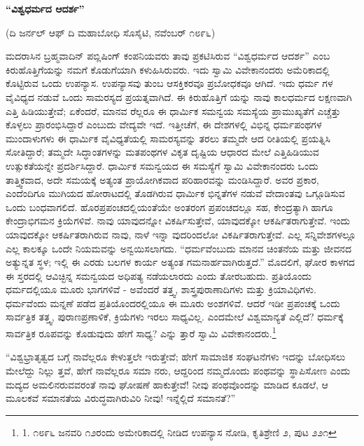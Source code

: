 \begin{center}
\textbf{“ವಿಶ್ವಧರ್ಮದ ಆದರ್ಶ”}
\end{center}

\begin{center}
(ದಿ ಜರ್ನಲ್ ಆಫ್ ದಿ ಮಹಾಬೋಧಿ ಸೊಸೈಟಿ, ನವೆಂಬರ್ ೧೮೯೬)
\end{center}

ಮದರಾಸಿನ ಬ್ರಹ್ಮವಾದಿನ್ ಪಬ್ಲಿಷಿಂಗ್ ಕಂಪನಿಯವರು ತಾವು ಪ್ರಕಟಿಸಿರುವ “ವಿಶ್ವಧರ್ಮದ ಆದರ್ಶ” ಎಂಬ ಕಿರುಹೊತ್ತಿಗೆಯನ್ನು ನಮಗೆ ಕೊಡುಗೆಯಾಗಿ ಕಳುಹಿಸಿರುವರು. ಇದು ಸ್ವಾಮಿ ವಿವೇಕಾನಂದರು ಅಮೆರಿಕಾದಲ್ಲಿ ಕೊಟ್ಟಿರುವ ಒಂದು ಉಪನ್ಯಾಸ. ಉಪನ್ಯಾಸವು ತುಂಬ ಆಸಕ್ತಿಕರವೂ ಪ್ರಬೋಧಕವೂ ಆಗಿದೆ. ಇದು ಧರ್ಮ ಗಳ ವೈವಿಧ್ಯದ ನಡುವೆ ಒಂದು ಸಾಮರಸ್ಯದ ಪ್ರಯತ್ನವಾಗಿದೆ. ಈ ಕಿರುಹೊತ್ತಿಗೆ ಯನ್ನು ನಾವು ಕಾಲಧರ್ಮದ ಲಕ್ಷಣವಾಗಿ ಎತ್ತಿ ಹಿಡಿಯುತ್ತೇವೆ; ಏಕೆಂದರೆ, ಮಾನವ ರೆಲ್ಲರೂ ಈ ಧಾರ್ಮಿಕ ಸಮನ್ವಯ ಸಮಸ್ಯೆಯ ಪ್ರಾಮುಖ್ಯತೆಗೆ ಎಚ್ಚೆತ್ತು ಕೊಳ್ಳಲು ಪ್ರಾರಂಭಿಸಿದ್ದಾರೆ ಎಂಬುದು ವೇದ್ಯವೇ ಇದೆ. ಇತ್ತೀಚೆಗೆ, ಈ ದೇಶಗಳಲ್ಲಿ ವಿಭಿನ್ನ ಧರ್ಮಪಂಥಗಳ ಮುಂದಾಳುಗಳು ಈ ಧಾರ್ಮಿಕ ವೈವಿಧ್ಯತೆಯಲ್ಲಿ ಸಾಮರಸ್ಯವನ್ನು ತರಲು ತಮ್ಮದೇ ಆದ ರೀತಿಯಲ್ಲಿ ಪ್ರಯತ್ನಿಸಿ ಸೋತಿದ್ದಾರೆ; ತಮ್ಮದೇ ಸಿದ್ಧಾಂತಗಳನ್ನು ಮತಪಂಥಗಳ ವಿಕೃತ ದೃಷ್ಟಿಯ ಆಧಾರದ ಮೇಲೆ ಎತ್ತಿಹಿಡಿಯುವ ಉತ್ಸುಕತೆಯನ್ನೇ ಪ್ರದರ್ಶಿಸಿದ್ದಾರೆ. ಧಾರ್ಮಿಕ ಸಮನ್ವಯದ ಈ ಸಮಸ್ಯೆಗೆ ಸ್ವಾಮಿ ವಿವೇಕಾನಂದರು ಒಂದು ತಾತ್ತ್ವಿಕವಾದ, ಅದೇ ಸಮಯಕ್ಕೆ ಅತ್ಯಂತ ಪ್ರಾಯೋಗಿಕವಾದ ಪರಿಹಾರವನ್ನು ಮಂಡಿಸಿದ್ದಾರೆ. ಅವರ ಪ್ರಕಾರ, ಎಂದೆಂದಿಗೂ ಮುಗಿಯದ ಹೋರಾಟದಲ್ಲಿ ತೊಡಗಿರುವ ಧಾರ್ಮಿಕ ಭಿನ್ನತೆಗಳ ನಡುವೆ ವೇದಾಂತವು ಒಗ್ಗೂಡಿಸುವ ಒಂದು ಬಂಧವಾಗಲಿದೆ. ಹೊರಪ್ರಪಂಚದಲ್ಲಿಯಂತೆಯೇ ಅಂತರಂಗ ಪ್ರಪಂಚದಲ್ಲೂ ಸಹ, ಕೇಂದ್ರತ್ಯಾಗಿ ಹಾಗೂ ಕೇಂದ್ರಾಭಿಗಮನ ಕ್ರಿಯೆಗಳಿವೆ. ನಾವು ಯಾವುದನ್ನೋ ವಿಕರ್ಷಿಸುತ್ತೇವೆ, ಯಾವುದಕ್ಕೋ ಆಕರ್ಷಿತರಾಗುತ್ತೇವೆ. ಇಂದು ಯಾವುದಕ್ಕೋ ಆಕರ್ಷಿತರಾಗಿರುವ ನಾವು, ನಾಳೆ ಇನ್ನಾ ವುದರಿಂದಲೋ ವಿಕರ್ಷಿತರಾಗುತ್ತೇವೆ. ಎಲ್ಲ ಸನ್ನಿವೇಶಗಳಲ್ಲೂ ಎಲ್ಲ ಕಾಲಕ್ಕೂ ಒಂದೇ ನಿಯಮವನ್ನು ಅನ್ವಯಿಸಲಾಗದು. “ಧರ್ಮವೆಂಬುದು ಮಾನವ ಚಿಂತನೆಯ ಮತ್ತು ಜೀವನದ ಅತ್ಯುನ್ನತ ಸ್ಥಳ; ಇಲ್ಲಿ ಈ ಎರಡು ಬಲಗಳ ಕಾರ್ಯ ಅತ್ಯಂತ ಗಮನಾರ್ಹವಾಗಿರುತ್ತದೆ.” ಮೊದಲಿಗೆ, ಘೋರ ಕಾಳಗದ ಈ ಸ್ತರದಲ್ಲಿ ಆವಿಚ್ಛಿನ್ನ ಸಮನ್ವಯದ ಅಧಿಪತ್ಯ ನಡೆಯಲಾರದು ಎಂದು ತೋರಬಹುದು. ಪ್ರತಿಯೊಂದು ಧರ್ಮದಲ್ಲಿಯೂ ಮೂರು ಭಾಗಗಳಿವೆ - ಅವೆಂದರೆ ತತ್ತ್ವ, ಶಾಸ್ತ್ರಪುರಾಣಾದಿಗಳು ಮತ್ತು ಕ್ರಿಯಾವಿಧಿಗಳು. ಧರ್ಮವೆಂದು ಮನ್ನಣೆ ಪಡೆದ ಪ್ರತಿಯೊಂದರಲ್ಲಿಯೂ ಈ ಮೂರು ಅಂಶಗಳಿವೆ. ಆದರೆ ಇಡೀ ಪ್ರಪಂಚಕ್ಕೆ ಒಂದು ಸಾರ್ವತ್ರಿಕ ತತ್ತ್ವ, ಪುರಾಣಪ್ರಣಾಳಿಕೆ, ಕ್ರಿಯೆಗಳು ಇರಲು ಸಾಧ್ಯವಿಲ್ಲ. ಎಂದಮೇಲೆ ವಿಶ್ವಮಾನ್ಯತೆ ಎಲ್ಲಿದೆ? ಧರ್ಮಕ್ಕೆ ಸಾರ್ವತ್ರಿಕ ರೂಪವನ್ನು ಕೊಡುವುದು ಹೇಗೆ ಸಾಧ್ಯ? ಎನ್ನು ತ್ತಾರೆ ಸ್ವಾಮಿ ವಿವೇಕಾನಂದರು.\footnote{1. ೧೮೯೬ ಜನವರಿ ೧೨ರಂದು ಅಮೇರಿಕಾದಲ್ಲಿ ನೀಡಿದ ಉಪನ್ಯಾಸ ನೋಡಿ, ಕೃತಿಶ್ರೇಣಿ ೨, ಪುಟ ೨೨೧}

“ವಿಶ್ವಭ್ರಾತೃತ್ವದ ಬಗ್ಗೆ ನಾವೆಲ್ಲರೂ ಕೇಳುತ್ತಲೇ ಇರುತ್ತೇವೆ; ಹೇಗೆ ಸಾಮಾಜಿಕ ಸಂಘಟನೆಗಳು ಇದನ್ನು ಬೋಧಿಸಲು ಮೇಲೆದ್ದು ನಿಲ್ಲು ತ್ತವೆ, ಹೇಗೆ ನಾವೆಲ್ಲರೂ ಸಮಾ ನರು, ಆದ್ದರಿಂದ ನಮ್ಮದೊಂದು ಪಂಥವನ್ನು ಸ್ಥಾಪಿಸೋಣ ಎಂದು ಮದ್ಯದ ಅಮಲಿನರುವವರಂತೆ ನಾವು ಘೋಷಣೆ ಹಾಕುತ್ತೇವೆ! ನೀವು ಪಂಥವೊಂದನ್ನು ಮಾಡಿದ ಕೂಡಲೆ, ಆ ಮೂಲಕವೆ ಸಮಾನತೆಯ ವಿರುದ್ಧವಾಗಿರುವಿರಿ ನೀವು! ಇನ್ನೆಲ್ಲಿದೆ ಸಮಾನತೆ?”

